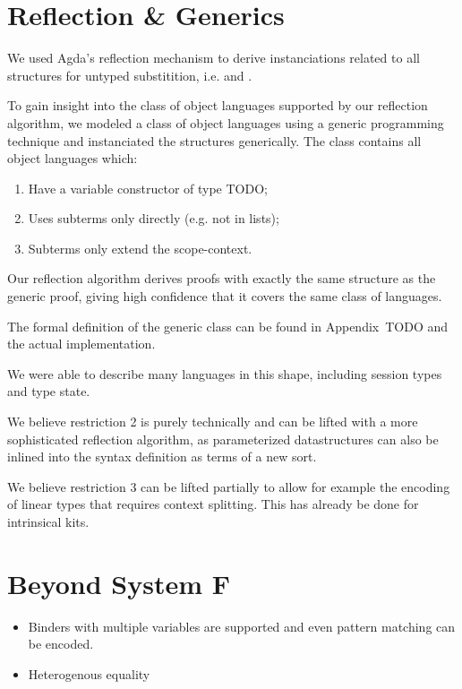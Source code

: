 \documentclass[sigplan,10pt, anonymous]{acmart}
\newcommand*\ACode[1]{\AgdaFontStyle{\textcolor{mygray}{#1}}}
\newcommand*\ACon[1]{\AgdaInductiveConstructor{#1}}
\begin{document}

  \section{Reflection \& Generics}
  \label{sec:reflection}
  We used Agda's reflection mechanism\cite{TODO} to derive
  instanciations related to all structures for untyped substitition,
  i.e. \ACode{\ACon{Traversal}} and \ACode{\ACon{ComposeTraversal}}.

  To gain insight into the class of object languages supported by our
  reflection algorithm, we modeled a class of object languages using a
  generic programming technique and instanciated the structures
  generically. The class contains all object languages which:
  \begin{enumerate}
  \item Have a variable constructor of type TODO;
  \item Uses subterms only directly (e.g. not in lists);
  \item Subterms only extend the scope-context.
  \end{enumerate}

  Our reflection algorithm derives proofs with exactly the same
  structure as the generic proof, giving high confidence that it covers
  the same class of languages.

  The formal definition of the generic class can be found in
  Appendix~TODO and the actual implementation.

  We were able to describe many languages in this shape, including
  session types and type state.

  We believe restriction 2 is purely technically and can be lifted
  with a more sophisticated reflection algorithm, as parameterized
  datastructures can also be inlined into the syntax definition as terms
  of a new sort.

  We believe restriction 3 can be lifted partially to allow for
  example the encoding of linear types that requires context
  splitting. This has already be done for intrinsical kits\cite{TODO}.


  \section{Beyond System F}
  \label{sec:beyond}
  \begin{itemize}
  \item
    Binders with multiple variables are supported and even pattern
    matching can be encoded.
  \item
    Heterogenous equality
  \end{itemize}
\end{document}
